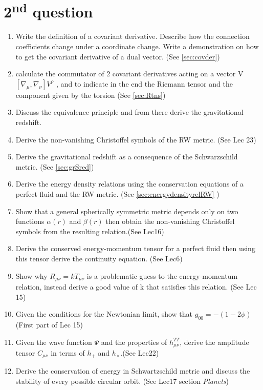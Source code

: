 \section{2\textsuperscript{nd} question}

\begin{enumerate}
	\item Write the definition of a covariant derivative. Describe how the connection coefficients change under a coordinate change. Write a demonstration on how to get the covariant derivative of a dual vector. (See \ref{sec:covder})
	\item calculate the commutator of 2 covariant derivatives acting on a vector V $\left[ \nabla _{\mu },\nabla _{\nu } \right]V^{\rho }$ , and to indicate in the end the Riemann tensor and the component given by the torsion (See \ref{sec:Rtns})
	\item Discuss the equivalence principle and from there derive the gravitational redshift. 
	\item Derive the non-vanishing Christoffel symbols of the RW metric. (See Lec 23)
	\item Derive the gravitational redshift as a consequence of the Schwarzschild metric. (See \ref{sec:grSred})
	\item Derive the energy density relations using the conservation equations of a perfect fluid and the RW metric. (See \ref{sec:energydensityrelRW} )
\item Show that a general spherically symmetric metric depends only on two functions $\alpha \left( r \right)$ and $\beta \left( r \right)$ then obtain the non-vanishing Christoffel symbols from the resulting relation.(See Lec16)
\item Derive the conserved energy-momentum tensor for a perfect fluid then using this tensor derive the continuity equation. (See Lec6)
\item Show why $R_{\mu \nu } = k T_{\mu \nu }$ is a problematic guess to the energy-momentum relation, instead derive a good value of k that satisfies this relation. (See Lec 15)
\item Given the conditions for the Newtonian limit, show that $g_{00 } = - \left( 1-2\phi  \right) $ (First part of Lec 15)
\item Given the wave function $\Psi $ and the properties of $h^{TT}_{\mu \nu }$, derive the amplitude tensor $C_{\mu \nu }$ in terms of $h_{+}$ and $h_{\times}$.(See Lec22)
\item Derive the conservation of energy in Schwartzschild metric and discuss the stability of every possible circular orbit. (See Lec17 section \emph{Planets})

\end{enumerate}
